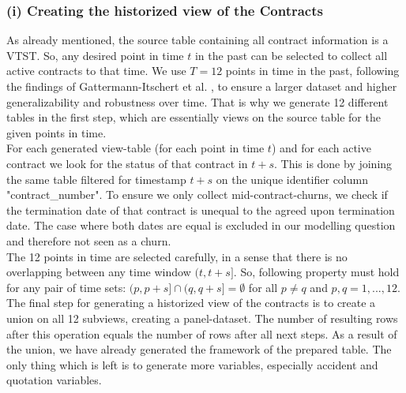 \documentclass[12pt,titlepage]{article}
\begin{document}
\subsubsection*{(i) Creating the historized view of the Contracts}
As already mentioned, the source table containing all contract information is a VTST. So, any desired point in time $t$ in the past can be selected to collect all active contracts to that time. We use $T=12$ points in time in the past, following the findings of Gattermann-Itschert et al. \cite{multiplets}, to ensure a larger dataset and higher generalizability and robustness over time. That is why we generate 12 different tables in the first step, which are essentially views on the source table for the given points in time.\\
For each generated view-table (for each point in time $t$) and for each active contract we look for the status of that contract in $t+s$. This is done by joining the same table filtered for timestamp $t+s$ on the unique identifier column "contract\_number". To ensure we only collect mid-contract-churns, we check if the termination date of that contract is unequal to the agreed upon termination date. The case where both dates are equal is excluded in our modelling question and therefore not seen as a churn. \\
The 12 points in time are selected carefully, in a sense that there is no overlapping between any time window $(t, t+s]$. So, following property must hold for any pair of time sets: $(p, p+s] \cap (q, q+s] = \emptyset$ for all $p \neq q$ and $p,q=1,...,12$. \\
The final step for generating a historized view of the contracts is to create a union on all 12 subviews, creating a panel-dataset. The number of resulting rows after this operation equals the number of rows after all next steps. As a result of the union, we have already generated the framework of the prepared table. The only thing which is left is to generate more variables, especially accident and quotation variables. \\
\end{document}
